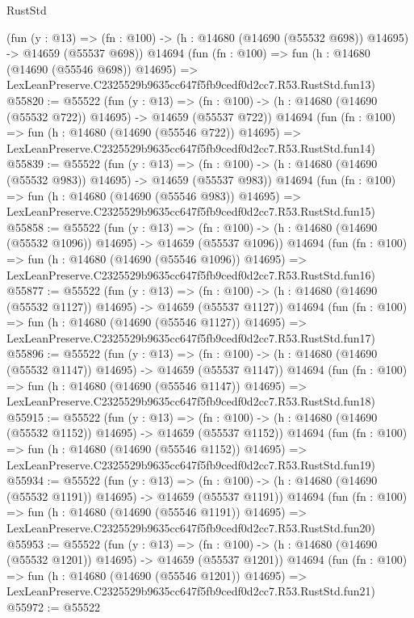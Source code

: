 \begin{lexlean}{RustStd}
\begin{coremodule}
    (fun (y : @13) =>
    (fn : @100) -> (h : @14680 (@14690 (@55532 @698)) @14695) -> @14659 (@55537 @698))
    @14694
    (fun (fn : @100) =>
    fun (h : @14680 (@14690 (@55546 @698)) @14695) =>
    LexLeanPreserve.C2325529b9635cc647f5fb9cedf0d2cc7.R53.RustStd.fun13)
@55820 := @55522
    (fun (y : @13) =>
    (fn : @100) -> (h : @14680 (@14690 (@55532 @722)) @14695) -> @14659 (@55537 @722))
    @14694
    (fun (fn : @100) =>
    fun (h : @14680 (@14690 (@55546 @722)) @14695) =>
    LexLeanPreserve.C2325529b9635cc647f5fb9cedf0d2cc7.R53.RustStd.fun14)
@55839 := @55522
    (fun (y : @13) =>
    (fn : @100) -> (h : @14680 (@14690 (@55532 @983)) @14695) -> @14659 (@55537 @983))
    @14694
    (fun (fn : @100) =>
    fun (h : @14680 (@14690 (@55546 @983)) @14695) =>
    LexLeanPreserve.C2325529b9635cc647f5fb9cedf0d2cc7.R53.RustStd.fun15)
@55858 := @55522
    (fun (y : @13) =>
    (fn : @100) -> (h : @14680 (@14690 (@55532 @1096)) @14695) -> @14659 (@55537 @1096))
    @14694
    (fun (fn : @100) =>
    fun (h : @14680 (@14690 (@55546 @1096)) @14695) =>
    LexLeanPreserve.C2325529b9635cc647f5fb9cedf0d2cc7.R53.RustStd.fun16)
@55877 := @55522
    (fun (y : @13) =>
    (fn : @100) -> (h : @14680 (@14690 (@55532 @1127)) @14695) -> @14659 (@55537 @1127))
    @14694
    (fun (fn : @100) =>
    fun (h : @14680 (@14690 (@55546 @1127)) @14695) =>
    LexLeanPreserve.C2325529b9635cc647f5fb9cedf0d2cc7.R53.RustStd.fun17)
@55896 := @55522
    (fun (y : @13) =>
    (fn : @100) -> (h : @14680 (@14690 (@55532 @1147)) @14695) -> @14659 (@55537 @1147))
    @14694
    (fun (fn : @100) =>
    fun (h : @14680 (@14690 (@55546 @1147)) @14695) =>
    LexLeanPreserve.C2325529b9635cc647f5fb9cedf0d2cc7.R53.RustStd.fun18)
@55915 := @55522
    (fun (y : @13) =>
    (fn : @100) -> (h : @14680 (@14690 (@55532 @1152)) @14695) -> @14659 (@55537 @1152))
    @14694
    (fun (fn : @100) =>
    fun (h : @14680 (@14690 (@55546 @1152)) @14695) =>
    LexLeanPreserve.C2325529b9635cc647f5fb9cedf0d2cc7.R53.RustStd.fun19)
@55934 := @55522
    (fun (y : @13) =>
    (fn : @100) -> (h : @14680 (@14690 (@55532 @1191)) @14695) -> @14659 (@55537 @1191))
    @14694
    (fun (fn : @100) =>
    fun (h : @14680 (@14690 (@55546 @1191)) @14695) =>
    LexLeanPreserve.C2325529b9635cc647f5fb9cedf0d2cc7.R53.RustStd.fun20)
@55953 := @55522
    (fun (y : @13) =>
    (fn : @100) -> (h : @14680 (@14690 (@55532 @1201)) @14695) -> @14659 (@55537 @1201))
    @14694
    (fun (fn : @100) =>
    fun (h : @14680 (@14690 (@55546 @1201)) @14695) =>
    LexLeanPreserve.C2325529b9635cc647f5fb9cedf0d2cc7.R53.RustStd.fun21)
@55972 := @55522

\end{coremodule}
\end{lexlean}
